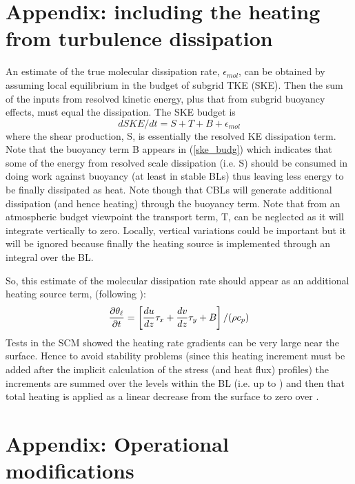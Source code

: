 \documentclass{UMDP_article}
\begin{document}
\section{Appendix: including the heating from turbulence dissipation}
\label{app:fricheat}

An estimate of the true molecular dissipation rate, $\epsilon_{mol}$,
can be obtained by assuming local equilibrium in the budget of subgrid
TKE (SKE). Then the sum of the inputs from resolved kinetic energy,
plus that from subgrid buoyancy effects, must equal the dissipation.
The SKE budget is
\begin{equation}
  d SKE/dt = S + T + B + \epsilon_{mol}
\label{ske_budg}
\end{equation}
where the shear production, S, is essentially the resolved KE
dissipation term.  Note that the buoyancy term B appears in
(\ref{ske_budg}) which indicates that some of the energy from resolved
scale dissipation (i.e. S) should be consumed in doing work against
buoyancy (at least in stable BLs) thus leaving less energy to be
finally dissipated as heat. Note though that CBLs will generate
additional dissipation (and hence heating) through the buoyancy term.
Note that from an atmospheric budget viewpoint the transport term, T,
can be neglected as it will integrate vertically to zero. Locally,
vertical variations could be important but it will be ignored because
finally the heating source is implemented through an integral over the
BL.

So, this estimate of the molecular dissipation rate should appear as
an additional heating source term, (following \cite{zhang1999}):
\begin{equation*}
  \frac{\partial \theta_{\ell}}{\partial t} =
  \left[\frac{du}{dz}\tau_x + \frac{dv}{dz}\tau_y  + B \right] / (\rho c_p)
\end{equation*}
Tests in the SCM showed the heating rate gradients can be very large
near the surface.  Hence to avoid stability problems (since this
heating increment must be added after the implicit calculation of the
stress (and heat flux) profiles) the increments are summed over the
levels within the BL (i.e. up to \zh) and then that total heating is
applied as a linear decrease from the surface to zero over \zh.

\section{Appendix: Operational modifications}
\label{app:opmods}
\end{document}
